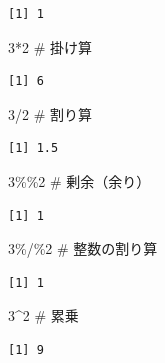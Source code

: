 \documentclass[
  letterpaper,
  DIV=11,
  numbers=noendperiod]{scrreprt}
\newenvironment{Shaded}{\begin{snugshade}}{\end{snugshade}}
\newcommand{\CommentTok}[1]{\textcolor[rgb]{0.37,0.37,0.37}{#1}}
\newcommand{\DecValTok}[1]{\textcolor[rgb]{0.68,0.00,0.00}{#1}}
\newcommand{\SpecialCharTok}[1]{\textcolor[rgb]{0.37,0.37,0.37}{#1}}
\begin{document}
\begin{verbatim}
[1] 1
\end{verbatim}

\begin{Shaded}
\begin{Highlighting}[]
\DecValTok{3}\SpecialCharTok{*}\DecValTok{2} \CommentTok{\# 掛け算}
\end{Highlighting}
\end{Shaded}

\begin{verbatim}
[1] 6
\end{verbatim}

\begin{Shaded}
\begin{Highlighting}[]
\DecValTok{3}\SpecialCharTok{/}\DecValTok{2} \CommentTok{\# 割り算}
\end{Highlighting}
\end{Shaded}

\begin{verbatim}
[1] 1.5
\end{verbatim}

\begin{Shaded}
\begin{Highlighting}[]
\DecValTok{3}\SpecialCharTok{\%\%}\DecValTok{2} \CommentTok{\# 剰余（余り）}
\end{Highlighting}
\end{Shaded}

\begin{verbatim}
[1] 1
\end{verbatim}

\begin{Shaded}
\begin{Highlighting}[]
\DecValTok{3}\SpecialCharTok{\%/\%}\DecValTok{2} \CommentTok{\# 整数の割り算}
\end{Highlighting}
\end{Shaded}

\begin{verbatim}
[1] 1
\end{verbatim}

\begin{Shaded}
\begin{Highlighting}[]
\DecValTok{3}\SpecialCharTok{\^{}}\DecValTok{2} \CommentTok{\# 累乗}
\end{Highlighting}
\end{Shaded}

\begin{verbatim}
[1] 9
\end{verbatim}
\end{document}
